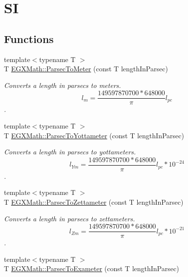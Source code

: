 \hypertarget{group___e_g_x_math-_conversions-_length_conversions-_astronomical-_parsec-_s_i}{}\section{SI}
\label{group___e_g_x_math-_conversions-_length_conversions-_astronomical-_parsec-_s_i}
\subsection*{Functions}
\begin{DoxyCompactItemize}
\item 
{\footnotesize template$<$typename T $>$ }\\T \mbox{\hyperlink{group___e_g_x_math-_conversions-_length_conversions-_astronomical-_parsec-_s_i_gaa97ff0501ce04074bf9aacafc2135532}{E\+G\+X\+Math\+::\+Parsec\+To\+Meter}} (const T length\+In\+Parsec)
\begin{DoxyCompactList}\small\item\em Converts a length in parsecs to meters. \[ l_{m}=\frac{149597870700 * 648000}{\pi}l_{pc} \]. \end{DoxyCompactList}\item 
{\footnotesize template$<$typename T $>$ }\\T \mbox{\hyperlink{group___e_g_x_math-_conversions-_length_conversions-_astronomical-_parsec-_s_i_ga8a5381e5fcaa36d464b5bdf17e238ef2}{E\+G\+X\+Math\+::\+Parsec\+To\+Yottameter}} (const T length\+In\+Parsec)
\begin{DoxyCompactList}\small\item\em Converts a length in parsecs to yottameters. \[ l_{Ym}=\frac{149597870700 * 648000}{\pi}l_{pc} * 10^{-24} \]. \end{DoxyCompactList}\item 
{\footnotesize template$<$typename T $>$ }\\T \mbox{\hyperlink{group___e_g_x_math-_conversions-_length_conversions-_astronomical-_parsec-_s_i_gad7d13308de04663badf7e5ea4021b43f}{E\+G\+X\+Math\+::\+Parsec\+To\+Zettameter}} (const T length\+In\+Parsec)
\begin{DoxyCompactList}\small\item\em Converts a length in parsecs to zettameters. \[ l_{Zm}=\frac{149597870700 * 648000}{\pi}l_{pc} * 10^{-21} \]. \end{DoxyCompactList}\item 
{\footnotesize template$<$typename T $>$ }\\T \mbox{\hyperlink{group___e_g_x_math-_conversions-_length_conversions-_astronomical-_parsec-_s_i_ga598f46c20868c84cf76fd6f934620728}{E\+G\+X\+Math\+::\+Parsec\+To\+Exameter}} (const T length\+In\+Parsec)

\end{DoxyCompactItemize}
